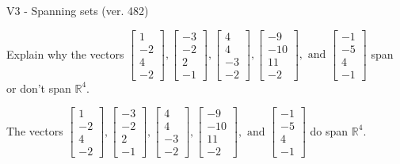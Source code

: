 \begin{exercise}
  \begin{exerciseTitle}V3 - Spanning sets (ver. 482)\end{exerciseTitle}
  \begin{exerciseStatement}
    Explain why the vectors \(\left[\begin{array}{r}
1 \\
-2 \\
4 \\
-2
\end{array}\right] , \left[\begin{array}{r}
-3 \\
-2 \\
2 \\
-1
\end{array}\right] , \left[\begin{array}{r}
4 \\
4 \\
-3 \\
-2
\end{array}\right] , \left[\begin{array}{r}
-9 \\
-10 \\
11 \\
-2
\end{array}\right] , \text{ and } \left[\begin{array}{r}
-1 \\
-5 \\
4 \\
-1
\end{array}\right]\) span or don't span \(\mathbb{R}^4\). 
	


  \end{exerciseStatement}
  \begin{exerciseAnswer}
   The vectors \(\left[\begin{array}{r}
1 \\
-2 \\
4 \\
-2
\end{array}\right] , \left[\begin{array}{r}
-3 \\
-2 \\
2 \\
-1
\end{array}\right] , \left[\begin{array}{r}
4 \\
4 \\
-3 \\
-2
\end{array}\right] , \left[\begin{array}{r}
-9 \\
-10 \\
11 \\
-2
\end{array}\right] , \text{ and } \left[\begin{array}{r}
-1 \\
-5 \\
4 \\
-1
\end{array}\right]\) 
  	 do  
	span \(\mathbb{R}^4\).
  



\end{exerciseAnswer}
\end{exercise}
